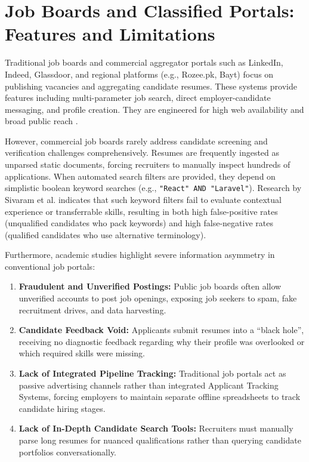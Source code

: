 \section{Job Boards and Classified Portals: Features and Limitations}
Traditional job boards and commercial aggregator portals such as LinkedIn, Indeed, Glassdoor, and regional platforms (e.g., Rozee.pk, Bayt) focus on publishing vacancies and aggregating candidate resumes. These systems provide features including multi-parameter job search, direct employer-candidate messaging, and profile creation. They are engineered for high web availability and broad public reach \cite{alotaibi2012survey}.

However, commercial job boards rarely address candidate screening and verification challenges comprehensively. Resumes are frequently ingested as unparsed static documents, forcing recruiters to manually inspect hundreds of applications. When automated search filters are provided, they depend on simplistic boolean keyword searches (e.g., \texttt{"React" AND "Laravel"}). Research by Sivaram et al. \cite{sivaram2022nlp} indicates that such keyword filters fail to evaluate contextual experience or transferrable skills, resulting in both high false-positive rates (unqualified candidates who pack keywords) and high false-negative rates (qualified candidates who use alternative terminology).

Furthermore, academic studies highlight severe information asymmetry in conventional job portals:
\begin{enumerate}
    \item \textbf{Fraudulent and Unverified Postings:} Public job boards often allow unverified accounts to post job openings, exposing job seekers to spam, fake recruitment drives, and data harvesting.
    \item \textbf{Candidate Feedback Void:} Applicants submit resumes into a ``black hole'', receiving no diagnostic feedback regarding why their profile was overlooked or which required skills were missing.
    \item \textbf{Lack of Integrated Pipeline Tracking:} Traditional job portals act as passive advertising channels rather than integrated Applicant Tracking Systems, forcing employers to maintain separate offline spreadsheets to track candidate hiring stages.
    \item \textbf{Lack of In-Depth Candidate Search Tools:} Recruiters must manually parse long resumes for nuanced qualifications rather than querying candidate portfolios conversationally.
\end{enumerate}

